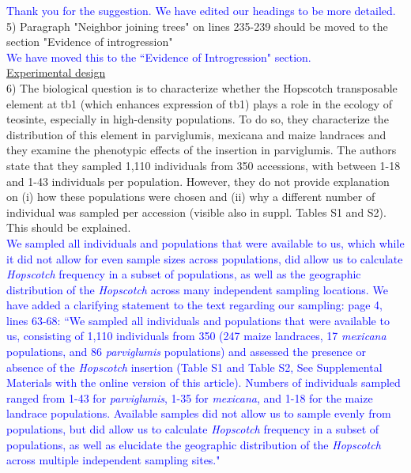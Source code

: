 \documentclass[11pt]{article}
\newcommand{\res}[1]{\noindent \textcolor{blue}{{#1}} \\}
\begin{document}
\res{Thank you for the suggestion. We have edited our headings to be more detailed.}

5) Paragraph "Neighbor joining trees" on lines 235-239 should be moved to the section "Evidence of introgression"\\

\res{We have moved this to the ``Evidence of Introgression" section.}

\underline{Experimental design}\\

6) The biological question is to characterize whether the Hopscotch transposable element at tb1 (which enhances expression of tb1) plays a role in the ecology of teosinte, especially in high-density populations. To do so, they characterize the distribution of this element in parviglumis, mexicana and maize landraces and they examine the phenotypic effects of the insertion in parviglumis.
The authors state that they sampled 1,110 individuals from 350 accessions, with between 1-18 and 1-43 individuals per population. However, they do not provide explanation on (i) how these populations were chosen and (ii) why a different number of individual was sampled per accession (visible also in suppl. Tables S1 and S2). This should be explained.\\

\res{We sampled all individuals and populations that were available to us, which while it did not allow for even sample sizes across populations, did allow us to calculate \emph{Hopscotch} frequency in a subset of populations, as well as the geographic distribution of the \emph{Hopscotch} across many independent sampling locations. We have added a clarifying statement to the text regarding our sampling: page 4, lines 63-68: ``We sampled all individuals and populations that were available to us, consisting of 1,110 individuals from 350 \track{populations} (247 maize landraces, 17 \emph{mexicana} populations, and 86 \emph{parviglumis} populations) and assessed the presence or absence of the \emph{Hopscotch} insertion (Table S1 and Table S2, See Supplemental Materials with the online version of this article). Numbers of individuals sampled \track{per population} ranged from 1-43 for \emph{parviglumis}, 1-35 for \emph{mexicana}, and 1-18 for the maize landrace populations. Available samples did not allow us to sample evenly from populations, but did allow us to calculate \emph{Hopscotch} frequency in a subset of populations, as well as elucidate the geographic distribution of the \emph{Hopscotch} across multiple independent sampling sites."}
\end{document}
